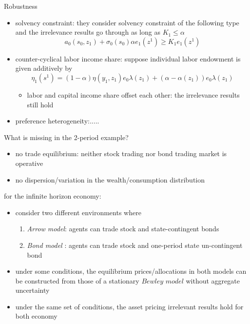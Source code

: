 \documentclass[9pt]{beamer}
\theoremstyle{mystyle}
\begin{document}
\begin{frame}{Robustness}
\begin{itemize}
\item solvency constraint: they consider solvency constraint of the following type and the irrelevance results go through as long as $K_1\leq\alpha$
\begin{equation*}
a_0(s_0,z_1) + \sigma_0(s_0)\alpha e_1(z^1) \geq K_1e_1(z^1)
\end{equation*}
\vspace{2mm}
\item counter-cyclical labor income share: suppose individual labor endowment is given additively by
\begin{equation*}
\eta_1(s^1) = (1-\alpha)\eta(y_1,z_1)e_0\lambda(z_1) + (\alpha-\alpha(z_1))e_0\lambda(z_1)
\end{equation*}
\begin{itemize}
\vspace{2mm}
\item labor and capital income share offset each other: the irrelevance results still hold 
\end{itemize}
\vspace{2mm}
\item preference heterogeneity:.....
\end{itemize}
\end{frame}
\begin{frame}{What is missing in the 2-period example?}
\begin{itemize}
\item no trade equilibrium: neither stock trading nor bond trading market is operative 
\vspace{5mm}
\item no dispersion/variation in the wealth/consumption distribution
\end{itemize}
\vspace{5mm}
for the infinite horizon economy: 
\vspace{5mm}
\begin{itemize}
\item consider two different environments where 
\vspace{2mm}
\begin{enumerate}
\item \textit{Arrow model}: agents can trade stock and state-contingent bonds  
\vspace{2mm}
\item \textit{Bond model} :  agents can trade stock and one-period state un-contingent bond
\end{enumerate}
\vspace{5mm}
\item under some conditions, the equilibrium prices/allocations in both models can be constructed from those of a stationary $\textit{Bewley model}$ without aggregate uncertainty 
\vspace{5mm}
\item under the same set of conditions, the asset pricing irrelevant results hold for both economy 
\end{itemize}
\end{frame}
\end{document}
